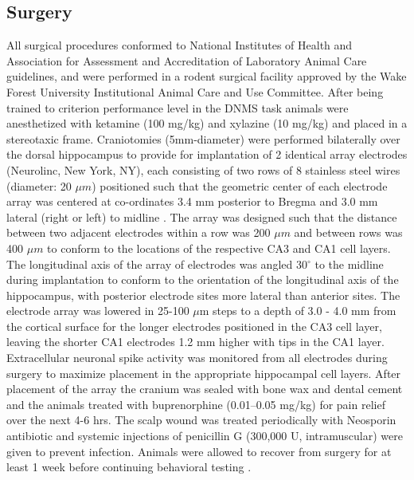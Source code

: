 \documentclass[11pt,a4paper,final]{article}
\begin{document}
    \subsection{Surgery}
All surgical procedures conformed to National Institutes of Health and Association for Assessment and Accreditation of Laboratory Animal Care guidelines, and were performed in a rodent surgical facility approved by the Wake Forest University Institutional Animal Care and Use Committee.
After being trained to criterion performance level in the DNMS task animals were anesthetized with ketamine (100 mg/kg) and xylazine (10 mg/kg) and placed in a stereotaxic frame.
Craniotomies (5mm-diameter) were performed bilaterally over the dorsal hippocampus to provide for implantation of 2 identical array electrodes (Neurolinc, New York, NY), each consisting of two rows of 8 stainless steel wires (diameter: 20 $\mu m$) positioned such that the geometric center of each electrode array was centered at co-ordinates 3.4 mm posterior to Bregma and 3.0 mm lateral (right or left) to midline \citep{paxinos86}.
The array was designed such that the distance between two adjacent electrodes within a row was 200 $\mu m$ and between rows was 400 $\mu m$ to conform to the locations of the respective CA3 and CA1 cell layers.
The longitudinal axis of the array of electrodes was angled 30$^{\circ}$ to the midline during implantation to conform to the orientation of the longitudinal axis of the hippocampus, with posterior electrode sites more lateral than anterior sites.
The electrode array was lowered in 25-100 $\mu$m steps to a depth of 3.0 - 4.0 mm from the cortical surface for the longer electrodes positioned in the CA3 cell layer, leaving the shorter CA1 electrodes 1.2 mm higher with tips in the CA1 layer.
Extracellular neuronal spike activity was monitored from all electrodes during surgery to maximize placement in the appropriate hippocampal cell layers.
After placement of the array the cranium was sealed with bone wax and dental cement and the animals treated with buprenorphine (0.01–0.05 mg/kg) for pain relief over the next 4-6 hrs.
The scalp wound was treated periodically with Neosporin antibiotic and systemic injections of penicillin G (300,000 U, intramuscular) were given to prevent infection.
Animals were allowed to recover from surgery for at least 1 week before continuing behavioral testing \citep{berger12}.
\end{document}
